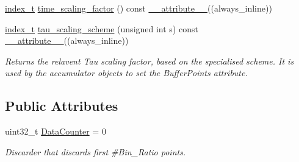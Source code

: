 \begin{DoxyCompactItemize}
\hyperlink{types_8hpp_a7c40bb931c31595ed6308605f4537447}{index\+\_\+t} \hyperlink{classMultiTau__ACorr__RT__Teensy_a218fdc2fcc3bb7cd5d1c2f03ea2506da}{time\+\_\+scaling\+\_\+factor} () const \hyperlink{utilities_8hpp_a103d5b3998e0dd804213c8f30a094f4d}{\+\_\+\+\_\+attribute\+\_\+\+\_\+}((always\+\_\+inline))
\item 
\hyperlink{types_8hpp_a7c40bb931c31595ed6308605f4537447}{index\+\_\+t} \hyperlink{classMultiTau__ACorr__RT__Teensy_af90bc219b8b9dc316c56efd7c74aae6f}{tau\+\_\+scaling\+\_\+scheme} (unsigned int s) const \hyperlink{utilities_8hpp_a103d5b3998e0dd804213c8f30a094f4d}{\+\_\+\+\_\+attribute\+\_\+\+\_\+}((always\+\_\+inline))
\begin{DoxyCompactList}\small\item\em Returns the relavent Tau scaling factor, based on the specialised scheme. It is used by the accumulator objects to set the Buffer\+Points attribute. \end{DoxyCompactList}\end{DoxyCompactItemize}
\subsection*{Public Attributes}
\begin{DoxyCompactItemize}
\item 
uint32\+\_\+t \hyperlink{classMultiTau__ACorr__RT__Teensy_ac403944f1456e09036bef6dc60d5a0b2}{Data\+Counter} = 0
\begin{DoxyCompactList}\small\item\em Discarder that discards first \#\+Bin\+\_\+\+Ratio points. \end{DoxyCompactList}\end{DoxyCompactItemize}
